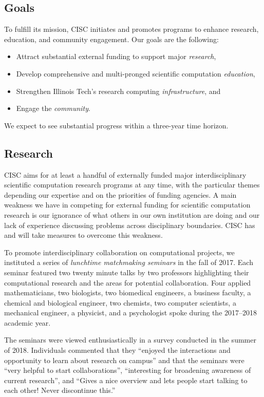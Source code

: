 \documentclass[12pt]{amsart}
\begin{document}
\subsection*{Goals}
To fulfill its mission, CISC initiates and promotes programs to enhance research, education, and community engagement.  Our goals are the following:
\begin{itemize}
    \item Attract substantial external funding to support major \emph{research},
    
    \item Develop comprehensive and multi-pronged scientific computation \emph{education},

    \item Strengthen Illinois Tech's research computing \emph{infrastructure}, and
    
    \item Engage the \emph{community}.
    
\end{itemize}
We expect to see substantial progress within a three-year time horizon.

\subsection*{Research} CISC aims for at least a handful of externally funded major interdisciplinary scientific computation research programs at any time, with the particular themes depending our expertise and on the priorities of funding agencies.  A main weakness we have in competing for external funding for scientific computation research is our ignorance of what others in our own institution are doing and our lack of experience discussing problems across disciplinary boundaries.  CISC has and will take measures to overcome this weakness.

To promote interdisciplinary collaboration on computational projects, we instituted a series of \emph{lunchtime matchmaking seminars} in the fall of 2017.  Each seminar featured two twenty minute talks by two professors highlighting their computational research and the areas for potential collaboration.  Four applied mathematicians, two biologists, two biomedical engineers, a business faculty, a chemical and biological engineer, two chemists, two computer scientists,  a mechanical engineer, a physicist, and a psychologist spoke during the 2017--2018 academic year. 

The seminars were viewed enthusiastically in a survey conducted in the summer of 2018. Individuals commented that they ``enjoyed the interactions and opportunity to learn about research on campus'' and that the seminars were ``very helpful to start collaborations'', ``interesting for broadening awareness of current research'', and ``Gives a nice overview and lets people start talking to each other! Never discontinue this.''
\end{document}
